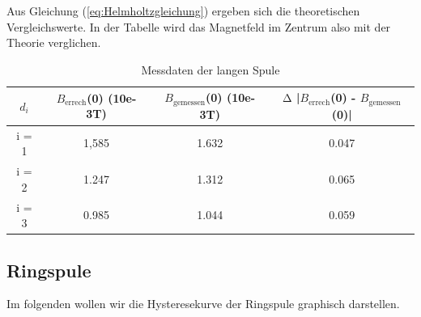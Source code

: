   Aus Gleichung (\ref{eq:Helmholtzgleichung}) ergeben sich die theoretischen Vergleichswerte.
  In der Tabelle wird das Magnetfeld im Zentrum also mit der Theorie verglichen.

  \begin{table}
    \centering
    \caption{Messdaten der langen Spule}
    \begin{tabular}{c c c c}
      \toprule
      $d_{i}$ & $B_{\text{errech}}$(0) (10e-3T) &  $B_{\text{gemessen}}$(0) (10e-3T) & $\increment$ |$B_{\text{errech}}$(0) - $B_{\text{gemessen}}$(0)| \\
      \midrule
      i = 1  & 1,585 &         1.632  & 0.047  \\ 
      i = 2  & 1.247 &         1.312  & 0.065  \\ 
      i = 3  & 0.985 &         1.044  & 0.059 \\ 
      \bottomrule
    \end{tabular}
  \end{table}

\subsection{Ringspule}

Im folgenden wollen wir die Hysteresekurve der Ringspule graphisch darstellen.

